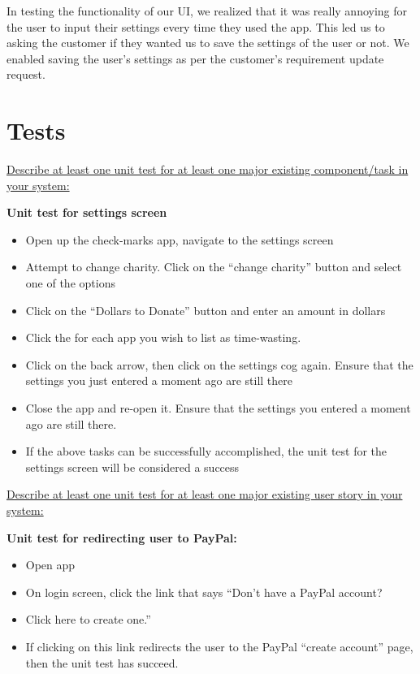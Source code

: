 \documentclass[a4paper]{article}
\begin{document}
    In testing the functionality of our UI, we realized that it was really annoying for the user to input their settings every time they used the app. This led us to asking the customer if they wanted us to save the settings of the user or not. We enabled saving the user’s settings as per the customer’s requirement update request.
    
    
\section{Tests}
\parindent1pt \underline{Describe at least one unit test for at least one major existing component/task in your system:}

\textbf{Unit test for settings screen}
\begin{itemize}
\item Open up the check-marks app, navigate to the settings screen
\item Attempt to change charity. Click on the “change charity” button and select one of the options
\item Click on the “Dollars to Donate” button and enter an amount in dollars
\item Click the for each app you wish to list as time-wasting.
\item Click on the back arrow, then click on the settings cog again. Ensure that the settings you just entered a moment ago are still there
\item Close the app and re-open it. Ensure that the settings you entered a moment ago are still there.
\item If the above tasks can be successfully accomplished, the unit test for the settings screen will be considered a success
\end{itemize}

\underline{Describe at least one unit test for at least one major existing user story in your system:}

\textbf{Unit test for redirecting user to PayPal:}
\begin{itemize}
\item Open app
\item On login screen, click the link that says “Don’t have a PayPal account? \item Click here to create one.”
\item If clicking on this link redirects the user to the PayPal “create account” page, then the unit test has succeed.
\end{itemize}
\end{document}
